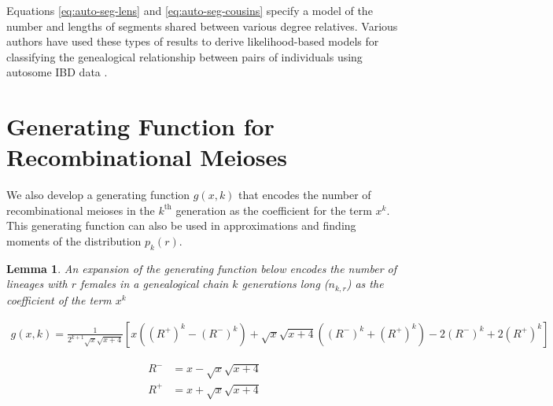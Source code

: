 \documentclass[11pt]{article}
\newtheorem{lemma}{Lemma}
\begin{document}
Equations \eqref{eq:auto-seg-lens} and \eqref{eq:auto-seg-cousins} specify a
model of the number and lengths of segments shared between various degree
relatives. Various authors have used these types of results to derive
likelihood-based models for classifying the genealogical relationship between
pairs of individuals using autosome IBD data
\citep{huff2011maximum,Henn:2012ij,Durand010512}. 

\section{Generating Function for Recombinational Meioses}
\label{ap:generating-function}

We also develop a generating function $g(x, k)$ that encodes the number of
recombinational meioses in the $k^{\text{th}}$ generation as the coefficient
for the term $x^k$. This generating function can also be used in approximations
and finding moments of the distribution $p_k(r)$.

\begin{lemma}
  An expansion of the generating function below encodes the number of lineages
  with $r$ females in a genealogical chain $k$ generations long ($n_{k,r}$) as
  the coefficient of the term $x^{k}$

  \begin{align}
    g(x, k) = \frac{1}{2^{k+1}\sqrt{x} \sqrt{x+4}}
    \left[x
    \left(\left(R^+\right)^k - \left(R^-\right)^k\right) + \sqrt{x} \sqrt{x+4}
    \left(\left(R^-\right)^k + \left(R^+\right)^k\right)
    -2 \left(R^-\right)^k+2 \left(R^+\right)^k\right]
  \end{align}


\begin{align}
    R^- &= x-\sqrt{x} \sqrt{x+4}\\
    R^+ &= x+\sqrt{x} \sqrt{x+4}
\end{align}

\end{lemma}
\end{document}
